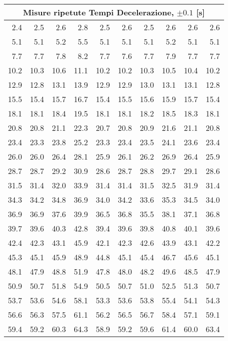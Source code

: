 \begin{tabular}{r r r r r r r r r r}

\multicolumn{ 10}{c}{Misure ripetute Tempi Decelerazione, $\pm 0.1$  [s]} \\ \hline
2.4 & 2.5 & 2.6 & 2.8 & 2.5 & 2.6 & 2.5 & 2.6 & 2.6 & 2.6 \\ \hline
5.1 & 5.1 & 5.2 & 5.5 & 5.1 & 5.1 & 5.1 & 5.2 & 5.1 & 5.1 \\ \hline
7.7 & 7.7 & 7.8 & 8.2 & 7.7 & 7.6 & 7.7 & 7.9 & 7.7 & 7.7 \\ \hline
10.2 & 10.3 & 10.6 & 11.1 & 10.2 & 10.2 & 10.3 & 10.5 & 10.4 & 10.2 \\ \hline
12.9 & 12.8 & 13.1 & 13.9 & 12.9 & 12.9 & 13.0 & 13.1 & 13.1 & 12.8 \\ \hline
15.5 & 15.4 & 15.7 & 16.7 & 15.4 & 15.5 & 15.6 & 15.9 & 15.7 & 15.4 \\ \hline
18.1 & 18.1 & 18.4 & 19.5 & 18.1 & 18.1 & 18.2 & 18.5 & 18.3 & 18.1 \\ \hline
20.8 & 20.8 & 21.1 & 22.3 & 20.7 & 20.8 & 20.9 & 21.6 & 21.1 & 20.8 \\ \hline
23.4 & 23.3 & 23.8 & 25.2 & 23.3 & 23.4 & 23.5 & 24.1 & 23.6 & 23.4 \\ \hline
26.0 & 26.0 & 26.4 & 28.1 & 25.9 & 26.1 & 26.2 & 26.9 & 26.4 & 25.9 \\ \hline
28.7 & 28.7 & 29.2 & 30.9 & 28.6 & 28.7 & 28.8 & 29.7 & 29.1 & 28.6 \\ \hline
31.5 & 31.4 & 32.0 & 33.9 & 31.4 & 31.4 & 31.5 & 32.5 & 31.9 & 31.4 \\ \hline
34.3 & 34.2 & 34.8 & 36.9 & 34.0 & 34.2 & 33.6 & 35.3 & 34.5 & 34.0 \\ \hline
36.9 & 36.9 & 37.6 & 39.9 & 36.5 & 36.8 & 35.5 & 38.1 & 37.1 & 36.8 \\ \hline
39.7 & 39.6 & 40.3 & 42.8 & 39.4 & 39.6 & 39.8 & 40.8 & 40.1 & 39.6 \\ \hline
42.4 & 42.3 & 43.1 & 45.9 & 42.1 & 42.3 & 42.6 & 43.9 & 43.1 & 42.2 \\ \hline
45.3 & 45.1 & 45.9 & 48.9 & 44.8 & 45.1 & 45.4 & 46.7 & 45.6 & 45.1 \\ \hline
48.1 & 47.9 & 48.8 & 51.9 & 47.8 & 48.0 & 48.2 & 49.6 & 48.5 & 47.9 \\ \hline
50.9 & 50.7 & 51.8 & 54.9 & 50.5 & 50.7 & 51.0 & 52.5 & 51.3 & 50.7 \\ \hline
53.7 & 53.6 & 54.6 & 58.1 & 53.3 & 53.6 & 53.8 & 55.4 & 54.1 & 54.3 \\ \hline
56.6 & 56.3 & 57.5 & 61.1 & 56.2 & 56.5 & 56.7 & 58.4 & 57.1 & 59.1 \\ \hline
59.4 & 59.2 & 60.3 & 64.3 & 58.9 & 59.2 & 59.6 & 61.4 & 60.0 & 63.4 \\ 
\end{tabular}
